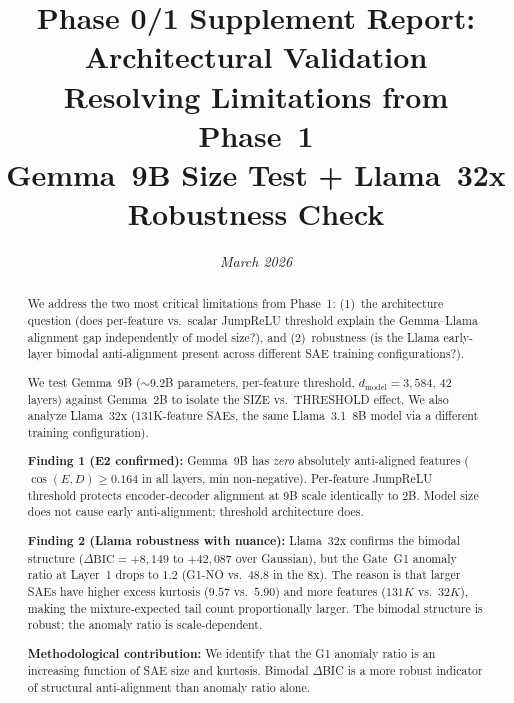 \documentclass[11pt,a4paper]{article}
\title{\Large\bfseries Phase 0/1 Supplement Report: Architectural Validation\\[0.5em]
\large Resolving Limitations from Phase~1\\[0.3em]
\normalsize Gemma~9B Size Test + Llama~32x Robustness Check}
\author{\textit{March 2026}}
\date{}
\begin{document}
\maketitle\thispagestyle{fancy}

\begin{abstract}
\noindent We address the two most critical limitations from Phase~1: (1)~the architecture question (does per-feature vs.\ scalar JumpReLU threshold explain the Gemma--Llama alignment gap independently of model size?), and (2)~robustness (is the Llama early-layer bimodal anti-alignment present across different SAE training configurations?).

We test Gemma~9B ($\sim$9.2B parameters, per-feature threshold, $d_\text{model}=3{,}584$, 42 layers) against Gemma~2B to isolate the SIZE vs.\ THRESHOLD effect. We also analyze Llama~32x (131K-feature SAEs, the same Llama~3.1~8B model via a different training configuration).

\textbf{Finding 1 (E2 confirmed):} Gemma~9B has \emph{zero} absolutely anti-aligned features ($\cos(E,D) \geq 0.164$ in all layers, min non-negative). Per-feature JumpReLU threshold protects encoder-decoder alignment at 9B scale identically to 2B. Model size does not cause early anti-alignment; threshold architecture does.

\textbf{Finding 2 (Llama robustness with nuance):} Llama~32x confirms the bimodal structure ($\Delta\text{BIC} = +8{,}149$ to $+42{,}087$ over Gaussian), but the Gate~G1 anomaly ratio at Layer~1 drops to 1.2 (G1-NO vs.\ 48.8 in the 8x). The reason is that larger SAEs have higher excess kurtosis ($9.57$ vs.\ $5.90$) and more features ($131K$ vs.\ $32K$), making the mixture-expected tail count proportionally larger. The bimodal structure is robust; the anomaly ratio is scale-dependent.

\textbf{Methodological contribution:} We identify that the G1 anomaly ratio is an increasing function of SAE size and kurtosis. Bimodal $\Delta$BIC is a more robust indicator of structural anti-alignment than anomaly ratio alone.
\end{abstract}

\medskip\noindent{}
\end{document}
